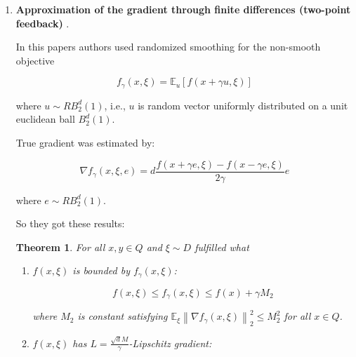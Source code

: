 \documentclass{article}
\newtheorem{theorem}{Theorem}
\begin{document}
        \begin{enumerate}
            \item \textbf{Approximation of the gradient through finite differences (two-point feedback)} \cite{shamir2017optimal, Randomized_gradient_free_methods_in_convex_optimization}. 
    
            In this papers authors used randomized smoothing for the non-smooth objective 
    
            \begin{equation*}
                \label{f_gamma}
                f_{\gamma}(x, \xi) = \mathbb{E}_u\left[f(x + \gamma u, \xi)\right]
            \end{equation*}
    
            where $u \sim RB^d_2(1)$, i.e., $u$ is random vector uniformly distributed on a unit euclidean ball $B_2^d(1)$.
            
            True gradient was estimated by:
    
            \begin{equation}
                \label{nabla(f)_gamma_tpf}
                \nabla f_{\gamma}(x, \xi, e) = d \dfrac{f(x+\gamma e, \xi) - f(x - \gamma e, \xi)}{2 \gamma} e
            \end{equation}
    
            where $e \sim RB^d_2(1)$.
    
            So they got these results:
    
            \begin{theorem} \label{th_1}
                For all $x, y \in Q$ and $\xi \sim D$ fulfilled what
    
                \begin{enumerate}
                    \item[$\bullet$] $f(x, \xi)$ is bounded by $f_{\gamma}(x, \xi)$:
                    
                    \begin{equation}
                        \label{prop_f_g_1_tpf}
                        f(x, \xi) \leq f_{\gamma}(x, \xi) \leq f(x) + \gamma M_2
                    \end{equation}
    
                    where $M_2$ is constant satisfying $\mathbb{E_\xi}\left\|\nabla f_{\gamma}(x, \xi)\right\|_2^2 \leq M_2^2$ for all $x \in Q$.
    
                    \item[$\bullet$] $f(x, \xi)$ has $L = \frac{\sqrt{d}M}{\gamma}$-Lipschitz gradient:
    

\end{enumerate}
\end{theorem}
\end{enumerate}
\end{document}
